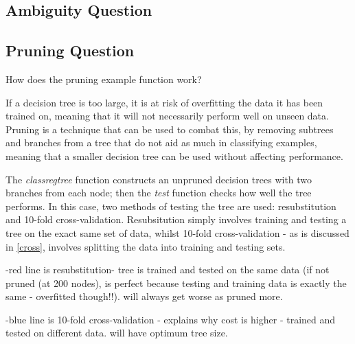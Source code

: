 \documentclass[a4paper,11pt]{article}
\begin{document}
\subsection{Ambiguity Question} \label{ambiguity}



\subsection{Pruning Question}

How does the pruning example function work? 

If a decision tree is too large, it is at risk of overfitting the data it has been trained on, meaning that it will not necessarily perform well on unseen data. Pruning is a technique that can be used to combat this, by removing subtrees and branches from a tree that do not aid as much in classifying examples, meaning that a smaller decision tree can be used without affecting performance. 

The \textit{classregtree} function constructs an unpruned decision trees with two branches from each node; then the \textit{test} function checks how well the tree performs. In this case, two methods of testing the tree are used: resubstitution and 10-fold cross-validation. Resubsitution simply involves training and testing a tree on the exact same set of data, whilst 10-fold cross-validation - as is discussed in \ref{cross}, involves splitting the data into training and testing sets.

-red line is resubstitution- tree is trained and tested on the same
 data (if not pruned (at 200 nodes), is perfect because testing and
 training data is exactly the same - overfitted though!!). will always
 get worse as pruned more.

-blue line is 10-fold cross-validation - explains why cost is higher -
 trained and tested on different data. will have optimum tree size.



\end{document}
